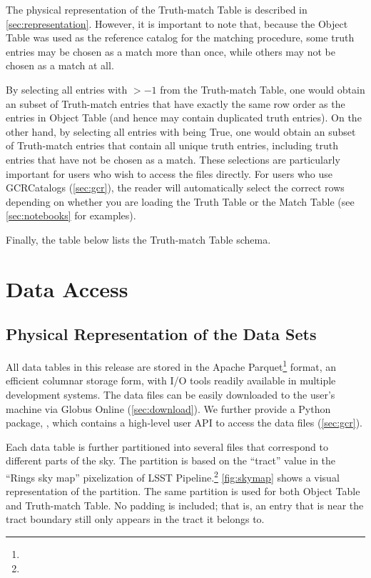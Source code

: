 \documentclass[11pt]{report}
\begin{document}
The physical representation of the Truth-match Table is described in \autoref{sec:representation}. 
However, it is important to note that, because the Object Table was used as the reference catalog for the matching procedure, some truth entries may be chosen as a match more than once, while others may not be chosen as a match at all.

By selecting all entries with  $> -1$ from the Truth-match Table, one would obtain an subset of Truth-match entries that have exactly the same row order as the entries in Object Table (and hence may contain duplicated truth entries). On the other hand, by selecting all entries with  being True, one  would obtain an subset of Truth-match entries that contain all unique truth entries, including truth entries that have not be chosen as a match.
These selections are particularly important for users who wish to access the files directly. For users who use GCRCatalogs (\autoref{sec:gcr}), the reader will automatically select the correct rows depending on whether you are loading the Truth Table or the Match Table (see \autoref{sec:notebooks} for examples).

Finally, the table below lists the Truth-match Table schema.





\section{Data Access}
\label{sec:access}


\subsection{Physical Representation of the Data Sets}
\label{sec:representation}

All data tables in this release are stored in the Apache Parquet\footnote{} format, an efficient columnar storage form, with I/O tools readily available in multiple development systems. 
The data files can be easily downloaded to the user's machine via Globus Online (\autoref{sec:download}). 
We further provide a Python package, , which contains a high-level user API to access the data files (\autoref{sec:gcr}). 

Each data table is further partitioned into several files that correspond to different parts of the sky. The partition is based on the ``tract'' value in the ``Rings sky map'' pixelization of LSST Pipeline.\footnote{} \autoref{fig:skymap} shows a visual representation of the partition. The same partition is used for both Object Table and Truth-match Table. No padding is included; that is, an entry that is near the tract boundary still only appears in the tract it belongs to. 
\end{document}
